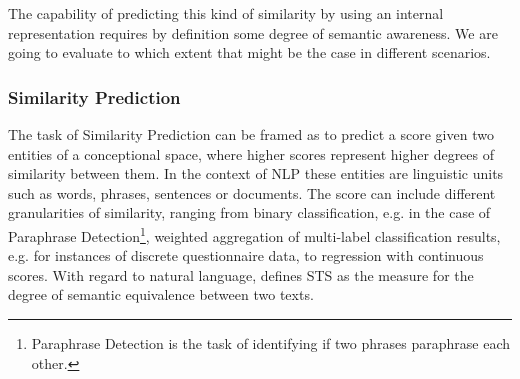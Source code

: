 The capability of predicting this kind of similarity by using an internal representation requires by definition some degree of semantic awareness. We are going to evaluate to which extent that might be the case in different scenarios.%



\subsubsection{Similarity Prediction}
The task of Similarity Prediction can be framed as to predict a score given two entities of a conceptional space, where higher scores represent higher degrees of similarity between them. In the context of \ac{NLP} these entities are linguistic units such as words, phrases, sentences or documents. The score can include different granularities of similarity, ranging from binary classification, e.g. in the case of Paraphrase Detection\footnote{Paraphrase Detection is the task of identifying if two phrases paraphrase each other.}, weighted aggregation of multi-label classification results, e.g. for instances of discrete %
questionnaire data, to regression with continuous scores. 
With regard to natural language, \Textcite{agirre_semeval-2012_2012} defines \acf{STS} as the measure for the degree of semantic equivalence between two texts.

